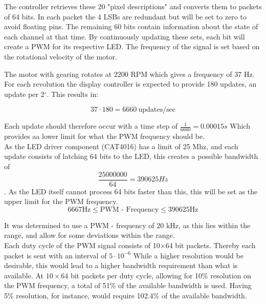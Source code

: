 The controller retrieves these 20 "pixel descriptions" and converts them to packets of 64 bits.
In each packet the 4 LSBs are redundant but will be set to zero to avoid floating pins.
The remaining 60 bits contain information about the state of each channel at that time.
By continuously updating these sets, each bit will create a PWM for its respective LED.
The frequency of the signal is set based on the rotational velocity of the motor.

The motor with gearing rotates at 2200 RPM which gives a frequency of 37 Hz.	
For each revolution the display controller is expected to provide 180 updates, an update per 2$^\circ$.
This results in:

$$37 \cdot 180 = 6660 ~\text{updates/sec}$$

Each update should therefore occur with a time step of $\frac{1}{6660} = 0.00015s$ Which provides aa lower limit for what the PWM frequency should be.  \\

As the LED driver component (CAT4016) has a limit of 25 Mhz, and each update consists of latching 64 bits to the LED, this creates a possible bandwidth of $$\frac{25000000}{64} =  390625 Hz$$. 
As the LED itself cannot process 64 bits faster than this, this will be set as the upper limit for the PWM frequency.    
$$6667 \text{Hz}  \leq \text{PWM - Frequency}  \leq 390625 \text{Hz}  $$

It was determined to use a PWM - frequency of 20 kHz, as this lies within the range, and allow for some deviations within the range.  \\

Each duty cycle of the PWM signal consists of 10$\times$64 bit packets.
Thereby each packet is sent with an interval of $5 \cdot 10^{-6}$
While a higher resolution would be desirable, this would lead to a higher bandwidth requirement than what is available.
At $10\times64$ bit packets per duty cycle, allowing for 10\% resolution on the PWM frequency, a total of 51\% of the available bandwidth is used.
Having 5\% resolution, for instance, would require 102.4\% of the available bandwidth.

